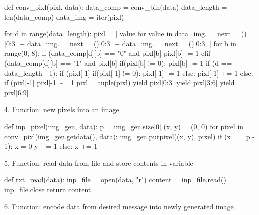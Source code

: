 \documentclass[11pt, english]{article}
\begin{document}
	{\small\begin{python}
	def conv_pixl(pixl, data):
    	    data_comp = conv_bin(data)
    	    data_length = len(data_comp)
    	    data_img = iter(pixl)

    	    for d in range(data_length):
                pixl = [
                    value for value in data_img.__next__()[0:3] +
                    data_img.__next__()[0:3] +
                    data_img.__next__()[0:3]
        	]
                for b in range(0, 8):
            	    if (data_comp[d][b] == "0" and pixl[b] %
                        pixl[b] -= 1
            	    elif (data_comp[d][b] == "1" and pixl[b] %
                        if(pixl[b] != 0):
                    	    pixl[b] -= 1
        	if (d == data_length - 1):
            	    if (pixl[-1] %
                        if(pixl[-1] != 0):
                    	    pixl[-1] -= 1
                	else:
                    	    pixl[-1] += 1
                else:
	    	    if (pixl[-1] %
                        pixl[-1] -= 1
        	pixl = tuple(pixl)
        	yield pixl[0:3]
        	yield pixl[3:6]
        	yield pixl[6:9]
	\end{python}}

	4. Function: new pixels into an image

	{\small\begin{python}
	def inp_pixel(img_gen, data):
    	    p = img_gen.size[0]
    	    (x, y) = (0, 0)
    	    for pixel in conv_pixl(img_gen.getdata(), data):
                img_gen.putpixel((x, y), pixel)
                if (x == p - 1):
            	    x = 0
            	    y += 1
        	else:
            	    x += 1
	\end{python}}

	5. Function: read data from file and store contents in variable

	{\small\begin{python}
	def txt_read(data):
    	    inp_file = open(data, "r")
    	    content = inp_file.read()
	    inp_file.close
    	    return content
	\end{python}}

	6. Function: encode data from desired message into newly generated image
\end{document}

